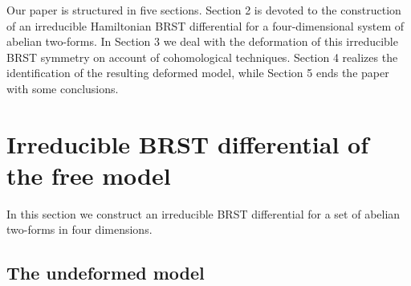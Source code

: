 \documentclass[a4paper,12pt]{article}
\begin{document}
Our paper is structured in five sections. Section 2 is devoted to the
construction of an irreducible Hamiltonian BRST differential for a
four-dimensional system of abelian two-forms. In Section 3 we deal with the
deformation of this irreducible BRST symmetry on account of cohomological
techniques. Section 4 realizes the identification of the resulting deformed
model, while Section 5 ends the paper with some conclusions.

\section{Irreducible BRST differential of the free model}

In this section we construct an irreducible BRST differential for a set of
abelian two-forms in four dimensions.

\subsection{The undeformed model}
\end{document}
